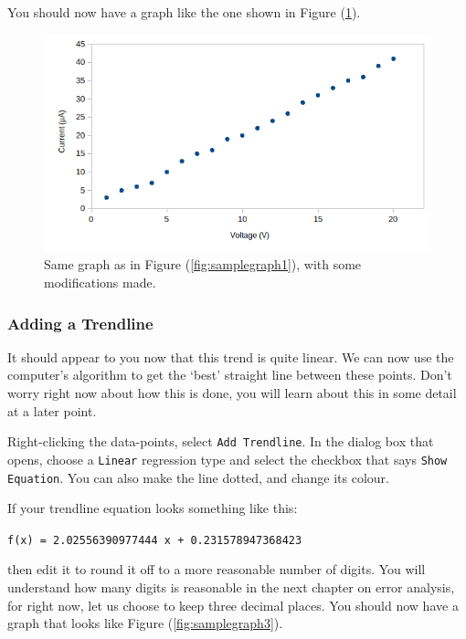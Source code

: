 You should now have a graph like the one shown in Figure (\ref{fig:samplegraph2}).

\begin{figure}[!htb]
    \centering
    \includegraphics[scale=0.8]{figs/samplegraph2.png}
    \caption{Same graph as in Figure (\ref{fig:samplegraph1}), with some modifications made.}
    \label{fig:samplegraph2}
\end{figure}


\subsubsection{Adding a Trendline}

It should appear to you now that this trend is quite linear. We can now use the computer's algorithm to get the `best' straight line between these points. Don't worry right now about how this is done, you will learn about this in some detail at a later point.

Right-clicking the data-points, select \texttt{Add Trendline}. In the dialog box that opens, choose a \texttt{Linear} regression type and select the checkbox that says \texttt{Show Equation}. You can also make the line dotted, and change its colour. 

If your trendline equation looks something like this:
\begin{center}
    \texttt{f(x) = 2.02556390977444 x + 0.231578947368423}
\end{center}

then edit it to round it off to a more reasonable number of digits. You will understand how many digits is reasonable in the next chapter on error analysis, for right now, let us choose to keep three decimal places. You should now have a graph that looks like Figure (\ref{fig:samplegraph3}).

